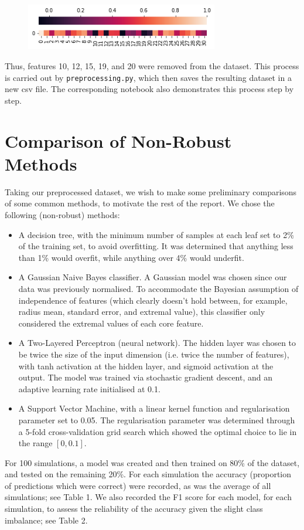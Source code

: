 \documentclass[11pt]{article}
\begin{document}
\begin{figure}[htb!]
	\centering
	\includegraphics[width=0.75\textwidth]{corr}
\end{figure}

Thus, features 10, 12, 15, 19, and 20 were removed from the dataset. This process is carried out by \texttt{preprocessing.py}, which then saves the resulting dataset in a new csv file. The corresponding notebook also demonstrates this process step by step. 

\section{Comparison of Non-Robust Methods}

Taking our preprocessed dataset, we wish to make some preliminary comparisons of some common methods, to motivate the rest of the report. We chose the following (non-robust) methods:
\begin{itemize}
	\item A decision tree, with the minimum number of samples at each leaf set to 2\% of the training set, to avoid overfitting. It was determined that anything less than 1\% would overfit, while anything over 4\% would underfit. 
	\item A Gaussian Naive Bayes classifier. A Gaussian model was chosen since our data was previously normalised. To accommodate the Bayesian assumption of independence of features (which clearly doesn't hold between, for example, radius mean, standard error, and extremal value), this classifier only considered the extremal values of each core feature. 
	\item A Two-Layered Perceptron (neural network). The hidden layer was chosen to be twice the size of the input dimension (i.e. twice the number of features), with tanh activation at the hidden layer, and sigmoid activation at the output. The model was trained via stochastic gradient descent, and an adaptive learning rate initialised at 0.1. 
	\item A Support Vector Machine, with a linear kernel function and regularisation parameter set to 0.05. The regularisation parameter was determined through a 5-fold cross-validation grid search which showed the optimal choice to lie in the range $[0, 0.1]$. 
\end{itemize}
For 100 simulations, a model was created and then trained on 80\% of the dataset, and tested on the remaining 20\%. For each simulation the accuracy (proportion of predictions which were correct) were recorded, as was the average of all simulations; see Table 1. We also recorded the F1 score for each model, for each simulation, to assess the reliability of the accuracy given the slight class imbalance; see Table 2. 
\end{document}
